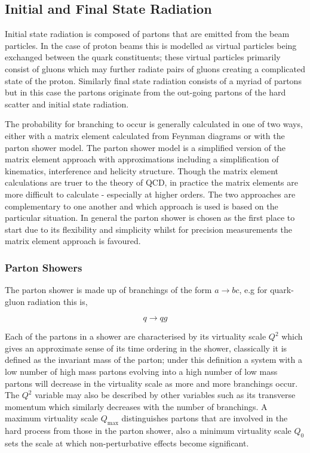 \subsection{Initial and Final State Radiation}
\label{section: parton shower}

Initial state radiation is composed of partons that are emitted from the  beam particles. In the case of proton beams this is modelled as virtual particles being exchanged between the quark constituents; these virtual particles primarily consist of gluons which may further radiate pairs of gluons creating a complicated state of the proton. Similarly final state radiation consists of a myriad of partons but in this case the partons originate from the out-going partons of the hard scatter and initial state radiation.

The probability for branching to occur is generally calculated in one of two ways, either with a matrix element calculated from Feynman diagrams or with the parton shower model. The parton shower model is a simplified version of the matrix element approach with approximations including a simplification of kinematics, interference and helicity structure. Though the matrix element calculations are truer to the theory of QCD, in practice the matrix elements are more difficult to calculate - especially at higher orders. The two approaches are complementary to one another and which approach is used is based on the particular situation. In general the parton shower is chosen as the first place to start due to its flexibility and simplicity whilst for precision measurements the matrix element approach is favoured.

\subsubsection*{Parton Showers}
The parton shower is made up of branchings of the form $a \rightarrow bc$, e.g for quark-gluon radiation this is, 

\begin{equation*}
	q \rightarrow qg
\end{equation*}

Each of the partons in a shower are characterised by its virtuality scale $Q^2$ which gives an approximate sense of its time ordering in the shower, classically it is defined as the invariant mass of the parton; under this definition a system with a low number of high mass partons evolving into a high number of low mass partons will decrease in the virtuality scale as more and more branchings occur. The $Q^2$ variable may also be described by other variables such as its transverse momentum which similarly decreases with the number of branchings. A maximum virtuality scale $Q_{\mathrm{max}}$ distinguishes partons that are involved in the hard process from those in the parton shower, also a minimum virtuality scale $Q_0$ sets the scale at which non-perturbative effects become significant.

